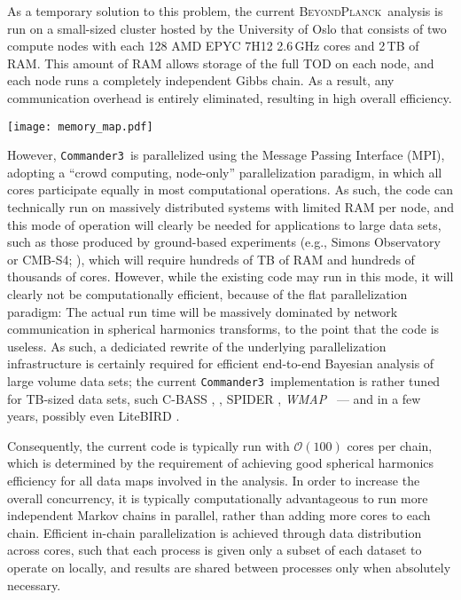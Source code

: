 \documentclass[twocolumn]{aa}
\def\WMAP{\emph{WMAP}}
\def\commanderthree{\texttt{Commander3}}
\newcommand{\BP}{\textsc{BeyondPlanck}}
\begin{document}
As a temporary solution to this problem, the current
\BP\ analysis \citep{BP01} is run on a small-sized cluster hosted by
the University of Oslo that consists of two compute nodes with each
128 AMD EPYC 7H12 2.6\,GHz cores and 2\,TB of RAM. This amount of RAM
allows storage of the full TOD on each node, and each node runs a
completely independent Gibbs chain. As a result, any communication
overhead is entirely eliminated, resulting in high overall efficiency.

\begin{figure*}[t]
  \center
  \texttt{[image: memory\_map.pdf]}
  \caption{\commanderthree\ memory layout for map and TOD objects. The
    top \texttt{process} box represents a single computing core. 
  }\label{fig:memory}
\end{figure*}

However, \commanderthree\ is parallelized using the Message Passing
Interface (MPI), adopting a ``crowd computing, node-only''
parallelization paradigm, in which all cores participate equally in
most computational operations. As such, the code can technically run
on massively distributed systems with limited RAM per node, and this mode
of operation will clearly be needed for applications to large data sets,
such as those produced by ground-based experiments (e.g., Simons
Observatory or CMB-S4; \citealp{simons,s4}), which will require hundreds of TB of RAM and
hundreds of thousands of cores. However, while the existing code may
run in this mode, it will clearly not be computationally efficient,
because of the flat parallelization paradigm: The actual run time will
be massively dominated by network communication in spherical harmonics
transforms, to the point that the code is useless. As such, a
dediciated rewrite of the underlying parallelization infrastructure is
certainly required for efficient end-to-end Bayesian analysis of large
volume data sets; the current \commanderthree\ implementation is
rather tuned for TB-sized data sets, such C-BASS \citep{cbass}, \Planck, SPIDER \citep{spider},
\WMAP\ \citep{wmap} --- and in a few years, possibly even LiteBIRD \citep{LiteBIRD}.

Consequently, the current code is typically run with
$\mathcal{O}(100)$ cores per chain, which is determined by the
requirement of achieving good spherical harmonics efficiency for all
data maps involved in the analysis. In order to increase the overall
concurrency, it is typically computationally advantageous to run more
independent Markov chains in parallel, rather than adding more cores
to each chain. Efficient in-chain parallelization is achieved through
data distribution across cores, such that each process is given only a
subset of each dataset to operate on locally, and results are shared
between processes only when absolutely necessary.
\end{document}
